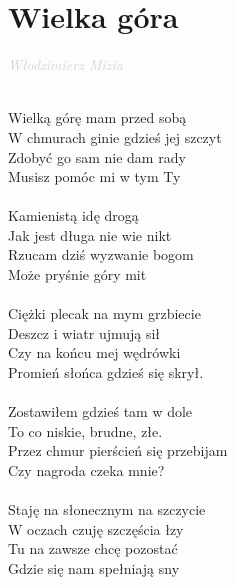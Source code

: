 \documentclass[a5paper, 10pt]{book}
\begin{document}
\newpage
\section{Wielka góra}\textcolor{lightgray}{\textit{Włodzimierz Mizia\\}}~\\
\begin{minipage}[t]{0.7\textwidth}
  Wielką górę mam przed sobą 			\\
  W chmurach ginie gdzieś jej szczyt 		\\
  Zdobyć go sam nie dam rady 			\\
  Musisz pomóc mi w tym Ty 			\\
  \\
  Kamienistą idę drogą 					\\
  Jak jest długa nie wie nikt 					\\
  Rzucam dziś wyzwanie bogom\\
  Może pryśnie góry mit \\
  \\
  Ciężki plecak na mym grzbiecie\\
  Deszcz i wiatr ujmują sił \\
  Czy na końcu mej wędrówki \\
  Promień słońca gdzieś się skrył. \\
  \\
  Zostawiłem gdzieś tam w dole \\
  To co niskie, brudne, złe. \\
  Przez chmur pierścień się przebijam \\
  Czy nagroda czeka mnie? \\
  \\
  Staję na słonecznym na szczycie\\
  W oczach czuję szczęścia łzy \\
  Tu na zawsze chcę pozostać\\
  Gdzie się nam spełniają sny\\
\end{minipage}
\end{document}
